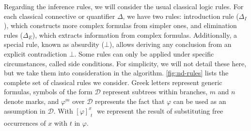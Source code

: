 Regarding the inference rules, we will consider the usual classical logic rules. For each classical connective or quantifier $\Delta$, we have two rules: introduction rule ($\Delta_I$), which constructs more complex formulas from simpler ones, and elimination rules ($\Delta_E$), which extracts information from complex formulas. Additionally, a special rule, known as absurdity (\(\bot\)), allows deriving any conclusion from an explicit contradiction $\bot$. Some rules can only be applied under specific circumstances, called side conditions. For simplicity, we will not detail these here, but we take them into consideration in the algorithm. \autoref{fig:nd-rules} lists the complete set of classical rules we consider. Greek letters represent generic formulas, symbols of the form \( \mathcal{D} \) represent subtrees within branches, \( m \) and \( n \) denote marks, and \(\displaystyle \varphi^m\) over \( \mathcal{D} \) represents the fact that $\varphi$ can be used as an assumption in \( \mathcal{D} \).
With \(\displaystyle \left[ \varphi \right]^x_{\substack{t}}\) we represent the result of substituting free occurrences of $x$ with $t$ in $\varphi$.


